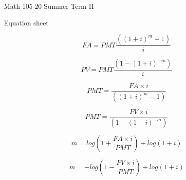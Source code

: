 \documentclass[11pt,epsfig]{article}
\begin{document}
Math 105-20 Summer Term II 

Equation sheet


\vspace{2pc}

\begin{equation*}
FA=PMT\frac{((1+i)^m-1)}{i}
\end{equation*}
\vfill


\begin{equation*}
PV=PMT\frac{(1-(1+i)^{-m})}{i}
\end{equation*}
\vfill


\begin{equation*}
PMT=\frac{FA\times i}{((1+i)^m-1)}
\end{equation*}
\vfill


\begin{equation*}
PMT=\frac{PV\times i}{(1-(1+i)^{-m})}
\end{equation*}
\vfill



\begin{equation*}
m=log(1+\frac{FA \times i}{PMT}) \div log(1+i) 
\end{equation*}
\vfill


\begin{equation*}
m=-log(1-\frac{PV \times i}{PMT}) \div log(1+i) 
\end{equation*}
\vfill
\end{document}
